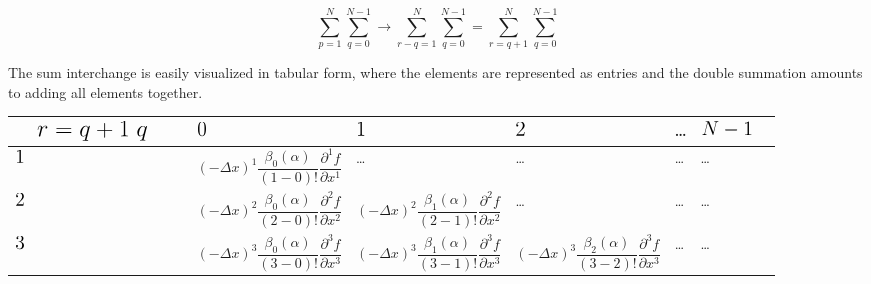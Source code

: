 \documentclass[11pt,titlepage]{report}
\begin{document}
$$\sum_{p = 1}^N\sum_{q = 0}^{N-1} \rightarrow \sum_{r - q = 1}^N\sum_{q = 0}^{N-1} = \sum_{r = q + 1}^N\sum_{q = 0}^{N-1}$$

\noindent The sum interchange is easily visualized in tabular form, where the elements are represented as entries and the double summation amounts to adding all elements together. \\[0.3em]


\begin{landscape}
\begin{table}[h!]
\begin{tabular}{|M{4cm}|M{4cm}|M{4cm}|M{4cm}|M{0.4cm}|M{5cm}|N}\hline
{}%
  {$\phantom{r =}\mathlarger{\mathlarger{\mathlarger{\mathlarger{r = q + 1}}}}$}{\\$\mathlarger{\mathlarger{\mathlarger{\mathlarger{q}}}}\phantom{edfsa}$}&
$\mathlarger{\mathlarger{\mathlarger{0}}}$ & $\mathlarger{\mathlarger{\mathlarger{1}}}$ & $\mathlarger{\mathlarger{\mathlarger{2}}}$ & \ldots & $\mathlarger{\mathlarger{\mathlarger{N-1}}}$ \\ \hline

$\mathlarger{\mathlarger{\mathlarger{1}}}$ & $$(-\Delta x)^1\frac{\beta_0(\alpha )}{(1 - 0)!}\frac{\partial^1 f}{\partial x^1}$$ & \ldots & \ldots &  \ldots& \ldots &\\[25pt] \hline

$\mathlarger{\mathlarger{\mathlarger{2}}}$ & $$(-\Delta x)^2\frac{\beta_0(\alpha )}{(2 - 0)!}\frac{\partial^2 f}{\partial x^2}$$ & $$(-\Delta x)^2\frac{\beta_1(\alpha )}{(2 - 1)!}\frac{\partial^2 f}{\partial x^2}$$ & \ldots  & \ldots & \ldots  &\\[25pt] \hline

 $\mathlarger{\mathlarger{\mathlarger{3}}}$& $$(-\Delta x)^3\frac{\beta_0(\alpha )}{(3 - 0)!}\frac{\partial^3 f}{\partial x^3}$$ & $$(-\Delta x)^3\frac{\beta_1(\alpha )}{(3 - 1)!}\frac{\partial^3 f}{\partial x^3}$$ & $$(-\Delta x)^3\frac{\beta_2(\alpha )}{(3 - 2)!}\frac{\partial^3 f}{\partial x^3}$$ &\ldots & \ldots & \\[25pt] \hline


\end{tabular}
\end{table}
\end{landscape}
\end{document}
